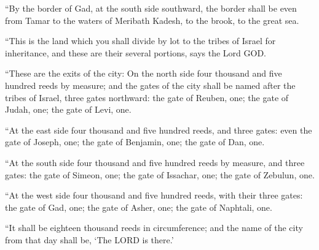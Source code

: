  ``By the border of Gad, at the south side southward, the
border shall be even from Tamar to the waters of Meribath Kadesh, to the
brook, to the great sea.

 ``This is the land which you shall divide by lot to the
tribes of Israel for inheritance, and these are their several portions,
says the Lord GOD.

 ``These are the exits of the city: On the north side
four thousand and five hundred reeds by measure;  and the
gates of the city shall be named after the tribes of Israel, three gates
northward: the gate of Reuben, one; the gate of Judah, one; the gate of
Levi, one.

 ``At the east side four thousand and five hundred reeds,
and three gates: even the gate of Joseph, one; the gate of Benjamin,
one; the gate of Dan, one.

 ``At the south side four thousand and five hundred reeds
by measure, and three gates: the gate of Simeon, one; the gate of
Issachar, one; the gate of Zebulun, one.

 ``At the west side four thousand and five hundred reeds,
with their three gates: the gate of Gad, one; the gate of Asher, one;
the gate of Naphtali, one.

 ``It shall be eighteen thousand reeds in circumference;
and the name of the city from that day shall be, `The LORD is there.'
